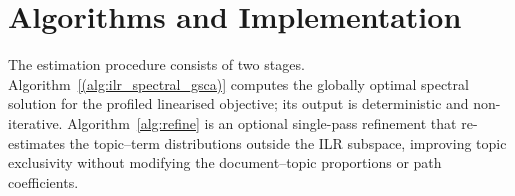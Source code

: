 \section{Algorithms and Implementation}
\label{sec:algorithm}

The estimation procedure consists of two stages.
Algorithm~\ref{(alg:ilr_spectral_gsca)} computes the globally optimal spectral
solution for the profiled linearised objective; its output is
deterministic and non-iterative.
Algorithm~\ref{alg:refine} is an optional single-pass refinement that
re-estimates the topic--term distributions outside the ILR subspace,
improving topic exclusivity without modifying the document--topic
proportions or path coefficients.

